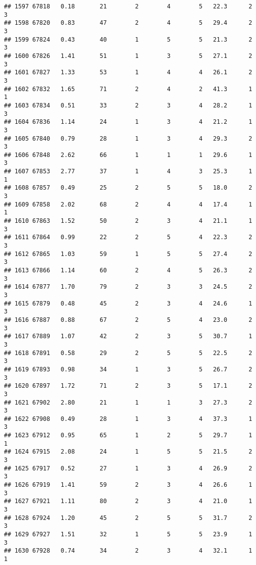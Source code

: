 \documentclass[
]{article}
\begin{document}
\begin{verbatim}
## 1597 67818   0.18       21        2        4        5   22.3      2      3
## 1598 67820   0.83       47        2        4        5   29.4      2      3
## 1599 67824   0.43       40        1        5        5   21.3      2      3
## 1600 67826   1.41       51        1        3        5   27.1      2      3
## 1601 67827   1.33       53        1        4        4   26.1      2      3
## 1602 67832   1.65       71        2        4        2   41.3      1      1
## 1603 67834   0.51       33        2        3        4   28.2      1      3
## 1604 67836   1.14       24        1        3        4   21.2      1      3
## 1605 67840   0.79       28        1        3        4   29.3      2      3
## 1606 67848   2.62       66        1        1        1   29.6      1      3
## 1607 67853   2.77       37        1        4        3   25.3      1      1
## 1608 67857   0.49       25        2        5        5   18.0      2      3
## 1609 67858   2.02       68        2        4        4   17.4      1      1
## 1610 67863   1.52       50        2        3        4   21.1      1      3
## 1611 67864   0.99       22        2        5        4   22.3      2      3
## 1612 67865   1.03       59        1        5        5   27.4      2      3
## 1613 67866   1.14       60        2        4        5   26.3      2      3
## 1614 67877   1.70       79        2        3        3   24.5      2      3
## 1615 67879   0.48       45        2        3        4   24.6      1      3
## 1616 67887   0.88       67        2        5        4   23.0      2      3
## 1617 67889   1.07       42        2        3        5   30.7      1      3
## 1618 67891   0.58       29        2        5        5   22.5      2      3
## 1619 67893   0.98       34        1        3        5   26.7      2      3
## 1620 67897   1.72       71        2        3        5   17.1      2      3
## 1621 67902   2.80       21        1        1        3   27.3      2      3
## 1622 67908   0.49       28        1        3        4   37.3      1      3
## 1623 67912   0.95       65        1        2        5   29.7      1      1
## 1624 67915   2.08       24        1        5        5   21.5      2      3
## 1625 67917   0.52       27        1        3        4   26.9      2      3
## 1626 67919   1.41       59        2        3        4   26.6      1      3
## 1627 67921   1.11       80        2        3        4   21.0      1      3
## 1628 67924   1.20       45        2        5        5   31.7      2      3
## 1629 67927   1.51       32        1        5        5   23.9      1      3
## 1630 67928   0.74       34        2        3        4   32.1      1      1

\end{verbatim}
\end{document}
